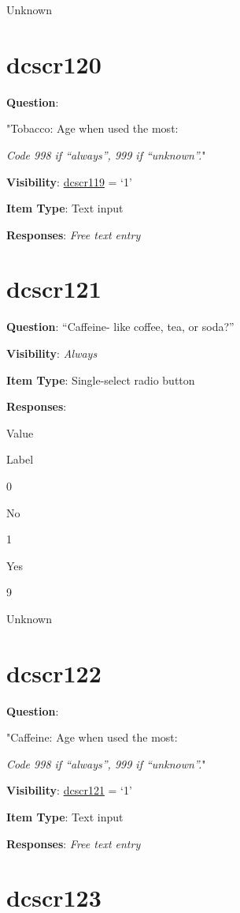 \documentclass[]{book}
\begin{document}
Unknown

\hypertarget{dcscr120}{%
\section{dcscr120}\label{dcscr120}}

\textbf{Question}:

"Tobacco: Age when used the most:

\emph{Code 998 if ``always'', 999 if ``unknown''.}"

\textbf{Visibility}: \protect\hyperlink{dcscr119}{dcscr119} = `1'

\textbf{Item Type}: Text input

\textbf{Responses}: \emph{Free text entry}

\hypertarget{dcscr121}{%
\section{dcscr121}\label{dcscr121}}

\textbf{Question}: ``Caffeine- like coffee, tea, or soda?''

\textbf{Visibility}: \emph{Always}

\textbf{Item Type}: Single-select radio button

\textbf{Responses}:

Value

Label

0

No

1

Yes

9

Unknown

\hypertarget{dcscr122}{%
\section{dcscr122}\label{dcscr122}}

\textbf{Question}:

"Caffeine: Age when used the most:

\emph{Code 998 if ``always'', 999 if ``unknown''.}"

\textbf{Visibility}: \protect\hyperlink{dcscr121}{dcscr121} = `1'

\textbf{Item Type}: Text input

\textbf{Responses}: \emph{Free text entry}

\hypertarget{dcscr123}{%
\section{dcscr123}\label{dcscr123}}
\end{document}

